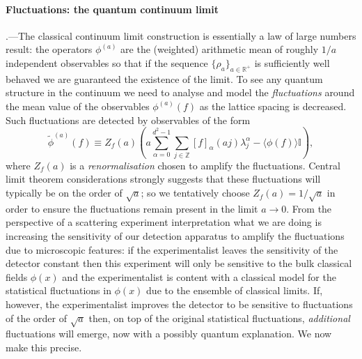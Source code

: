 \documentclass[prl,twocolumn,lengthcheck,superscriptaddress]{revtex4-1}
\theoremstyle{definition}
\theoremstyle{remark}
\begin{document}
\paragraph{Fluctuations: the quantum continuum limit}\hspace{-1em}.---The classical continuum limit construction is essentially a law of large numbers result: the operators $\phi^{(a)}$ are the (weighted) arithmetic mean of roughly $1/a$ independent observables so that if the sequence $\{\rho_a\}_{a\in\mathbb{R}^+}$ is sufficiently well behaved we are guaranteed the existence of the limit. To see any quantum structure in the continuum we need to analyse and model the \emph{fluctuations} around the mean value of the observables $\phi^{(a)}(f)$ as the lattice spacing is decreased. Such fluctuations are detected by observables of the form
\begin{equation}
	\widetilde{\phi}^{(a)}(f) \equiv Z_f(a)\left( a\sum_{\alpha=0}^{d^2-1}\sum_{j\in \mathbb{Z}} [f]_\alpha(aj) \lambda^\alpha_j - \langle\phi(f)\rangle\mathbb{I}\right),
\end{equation}
where $Z_f(a)$ is a \emph{renormalisation} chosen to amplify the fluctuations. Central limit theorem considerations strongly suggests that these fluctuations will typically be on the order of $\sqrt{a}$; so we tentatively choose $Z_f(a) = 1/\sqrt{a}$ in order to ensure the fluctuations remain present in the limit $a\rightarrow 0$. From the perspective of a scattering experiment interpretation what we are doing is increasing the sensitivity of our detection apparatus to amplify the fluctuations due to microscopic features: if the experimentalist leaves the sensitivity of the detector constant then this experiment will only be sensitive to the bulk classical fields $\phi(x)$ and the experimentalist is content with a classical model for the statistical fluctuations in $\phi(x)$ due to the ensemble of classical limits. If, however, the experimentalist improves the detector to be sensitive to fluctuations of the order of $\sqrt{a}$ then, on top of the original statistical fluctuations, \emph{additional} fluctuations will emerge, now with a possibly quantum explanation. We now make this precise. 
\end{document}
